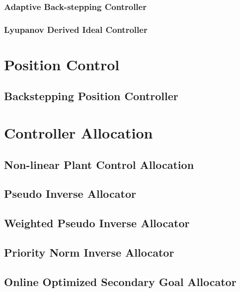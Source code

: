 \subsubsection{Adaptive Back-stepping Controller}
\subsubsection{Lyupanov Derived Ideal Controller}

\section{Position Control}
\subsection{Backstepping Position Controller}

\section{Controller Allocation}
\label{ch:control.allocation}
\subsection{Non-linear Plant Control Allocation}
\subsection{Pseudo Inverse Allocator}
\subsection{Weighted Pseudo Inverse Allocator}
\subsection{Priority Norm Inverse Allocator}
\subsection{Online Optimized Secondary Goal Allocator}

